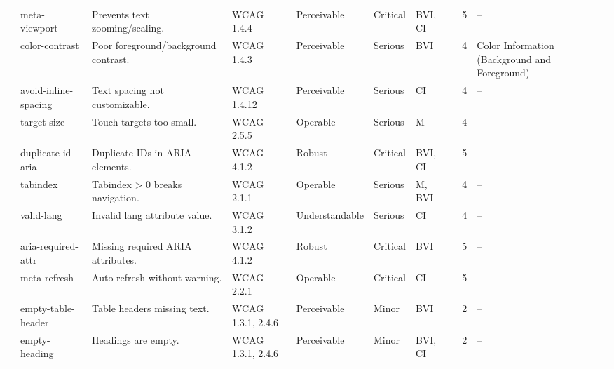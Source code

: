 \documentclass[sigconf, nonacm]{acmart}
\begin{document}
\begin{table}
{\begin{tabular}{|p{1.8cm}|p{2cm}|p{4.5cm}|p{1.5cm}|p{2cm}|p{1.4cm}|p{1.3cm}|p{1.8cm}|p{1.5cm}|p{2.8cm}|}
& meta-viewport & Prevents text zooming/scaling. & WCAG 1.4.4 & Perceivable & Critical & BVI, CI &  & 5 & -- \\ 
& color-contrast & Poor foreground/background contrast. & WCAG 1.4.3 & Perceivable & Serious & BVI &  & 4 & Color Information (Background and Foreground) \\ 
& avoid-inline-spacing & Text spacing not customizable. & WCAG 1.4.12 & Perceivable & Serious & CI &  & 4 & -- \\ 
& target-size & Touch targets too small. & WCAG 2.5.5 & Operable & Serious & M &  & 4 & -- \\ \hline

& duplicate-id-aria & Duplicate IDs in ARIA elements. & WCAG 4.1.2 & Robust & Critical & BVI, CI &  & 5 & -- \\ 
& tabindex & Tabindex > 0 breaks navigation. & WCAG 2.1.1 & Operable & Serious & M, BVI &  & 4 & -- \\ 
& valid-lang & Invalid lang attribute value. & WCAG 3.1.2 & Understandable & Serious & CI &  & 4 & -- \\ 
& aria-required-attr & Missing required ARIA attributes. & WCAG 4.1.2 & Robust & Critical & BVI &  & 5 & -- \\ 
& meta-refresh & Auto-refresh without warning. & WCAG 2.2.1 & Operable & Critical & CI &  & 5 & -- \\ 
& empty-table-header & Table headers missing text. & WCAG 1.3.1, 2.4.6 & Perceivable & Minor & BVI &  & 2 & -- \\ 
& empty-heading & Headings are empty. & WCAG 1.3.1, 2.4.6 & Perceivable & Minor & BVI, CI &  & 2 & -- \\ \hline

\end{tabular}
}
\label{tab:important_violations}
\end{table}
\fi
\end{document}
